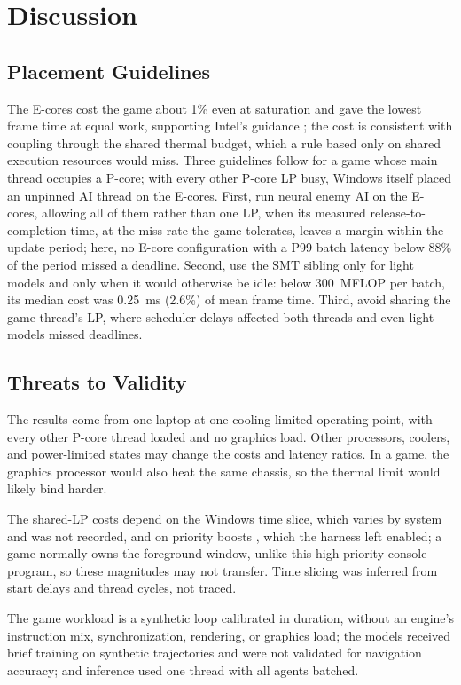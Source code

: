 \documentclass[conference]{IEEEtran}
\begin{document}
\section{Discussion}
\subsection{Placement Guidelines}
The E-cores cost the game about 1\% even at saturation and gave the lowest frame time at equal work, supporting Intel's guidance \cite{gerasimov}; the cost is consistent with coupling through the shared thermal budget, which a rule based only on shared execution resources would miss. Three guidelines follow for a game whose main thread occupies a P-core; with every other P-core LP busy, Windows itself placed an unpinned AI thread on the E-cores. First, run neural enemy AI on the E-cores, allowing all of them rather than one LP, when its measured release-to-completion time, at the miss rate the game tolerates, leaves a margin within the update period; here, no E-core configuration with a P99 batch latency below 88\% of the period missed a deadline. Second, use the SMT sibling only for light models and only when it would otherwise be idle: below 300~MFLOP per batch, its median cost was 0.25~ms (2.6\%) of mean frame time. Third, avoid sharing the game thread's LP, where scheduler delays affected both threads and even light models missed deadlines.

\subsection{Threats to Validity}
The results come from one laptop at one cooling-limited operating point, with every other P-core thread loaded and no graphics load. Other processors, coolers, and power-limited states may change the costs and latency ratios. In a game, the graphics processor would also heat the same chassis, so the thermal limit would likely bind harder.

The shared-LP costs depend on the Windows time slice, which varies by system \cite{msmultitask} and was not recorded, and on priority boosts \cite{msboost}, which the harness left enabled; a game normally owns the foreground window, unlike this high-priority console program, so these magnitudes may not transfer. Time slicing was inferred from start delays and thread cycles, not traced.

The game workload is a synthetic loop calibrated in duration, without an engine's instruction mix, synchronization, rendering, or graphics load; the models received brief training on synthetic trajectories and were not validated for navigation accuracy; and inference used one thread with all agents batched.
\end{document}
